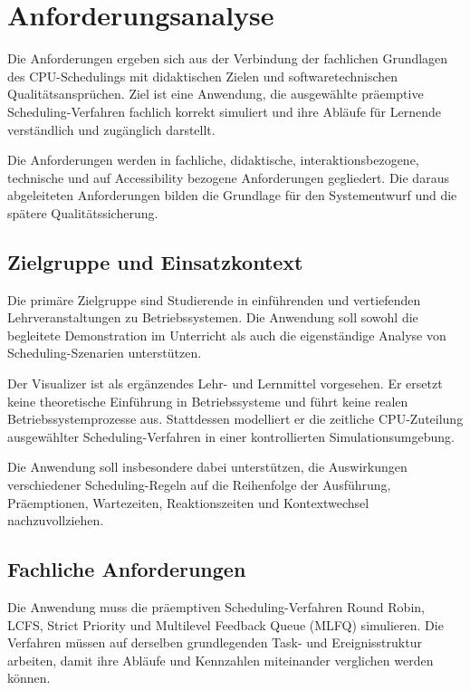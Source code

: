 \chapter{Anforderungsanalyse}

Die Anforderungen ergeben sich aus der Verbindung der fachlichen Grundlagen des CPU-Schedulings mit didaktischen Zielen und softwaretechnischen Qualitätsansprüchen. Ziel ist eine Anwendung, die ausgewählte präemptive Scheduling-Verfahren fachlich korrekt simuliert und ihre Abläufe für Lernende verständlich und zugänglich darstellt.

Die Anforderungen werden in fachliche, didaktische, interaktionsbezogene, technische und auf Accessibility bezogene Anforderungen gegliedert. Die daraus abgeleiteten Anforderungen bilden die Grundlage für den Systementwurf und die spätere Qualitätssicherung.

\section{Zielgruppe und Einsatzkontext}

Die primäre Zielgruppe sind Studierende in einführenden und vertiefenden Lehrveranstaltungen zu Betriebssystemen. Die Anwendung soll sowohl die begleitete Demonstration im Unterricht als auch die eigenständige Analyse von Scheduling-Szenarien unterstützen.

Der Visualizer ist als ergänzendes Lehr- und Lernmittel vorgesehen. Er ersetzt keine theoretische Einführung in Betriebssysteme und führt keine realen Betriebssystemprozesse aus. Stattdessen modelliert er die zeitliche CPU-Zuteilung ausgewählter Scheduling-Verfahren in einer kontrollierten Simulationsumgebung.

Die Anwendung soll insbesondere dabei unterstützen, die Auswirkungen verschiedener Scheduling-Regeln auf die Reihenfolge der Ausführung, Präemptionen, Wartezeiten, Reaktionszeiten und Kontextwechsel nachzuvollziehen.

\section{Fachliche Anforderungen}

Die Anwendung muss die präemptiven Scheduling-Verfahren Round Robin, LCFS, Strict Priority und Multilevel Feedback Queue (MLFQ) simulieren. Die Verfahren müssen auf derselben grundlegenden Task- und Ereignisstruktur arbeiten, damit ihre Abläufe und Kennzahlen miteinander verglichen werden können.

